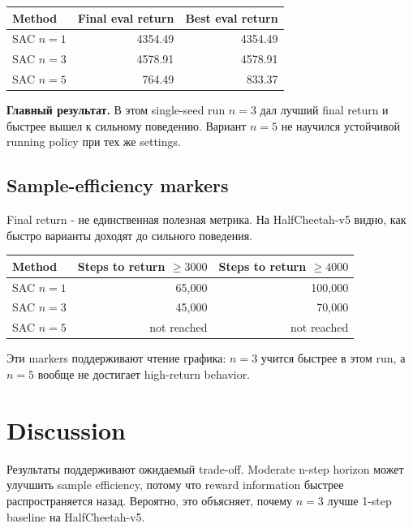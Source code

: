 \documentclass[
  russian,
]{article}
\begin{document}
\begin{longtable}[]{@{}lrr@{}}
\toprule\noalign{}
Method & Final eval return & Best eval return \\
\midrule\noalign{}
\endhead
\bottomrule\noalign{}
\endlastfoot
SAC \(n=1\) & 4354.49 & 4354.49 \\
SAC \(n=3\) & 4578.91 & 4578.91 \\
SAC \(n=5\) & 764.49 & 833.37 \\
\end{longtable}

\begin{keybox}
\textbf{Главный результат.} В этом single-seed run $n=3$ дал лучший final return и быстрее вышел к сильному поведению. Вариант $n=5$ не научился устойчивой running policy при тех же settings.
\end{keybox}

\subsection{Sample-efficiency markers}\label{sample-efficiency-markers}

Final return - не единственная полезная метрика. На HalfCheetah-v5
видно, как быстро варианты доходят до сильного поведения.

\begin{longtable}[]{@{}lrr@{}}
\toprule\noalign{}
Method & Steps to return \(\geq 3000\) & Steps to return
\(\geq 4000\) \\
\midrule\noalign{}
\endhead
\bottomrule\noalign{}
\endlastfoot
SAC \(n=1\) & 65,000 & 100,000 \\
SAC \(n=3\) & 45,000 & 70,000 \\
SAC \(n=5\) & not reached & not reached \\
\end{longtable}

Эти markers поддерживают чтение графика: \(n=3\) учится быстрее в этом
run, а \(n=5\) вообще не достигает high-return behavior.

\section{Discussion}\label{discussion}

Результаты поддерживают ожидаемый trade-off. Moderate n-step horizon
может улучшить sample efficiency, потому что reward information быстрее
распространяется назад. Вероятно, это объясняет, почему \(n=3\) лучше
1-step baseline на HalfCheetah-v5.
\end{document}
